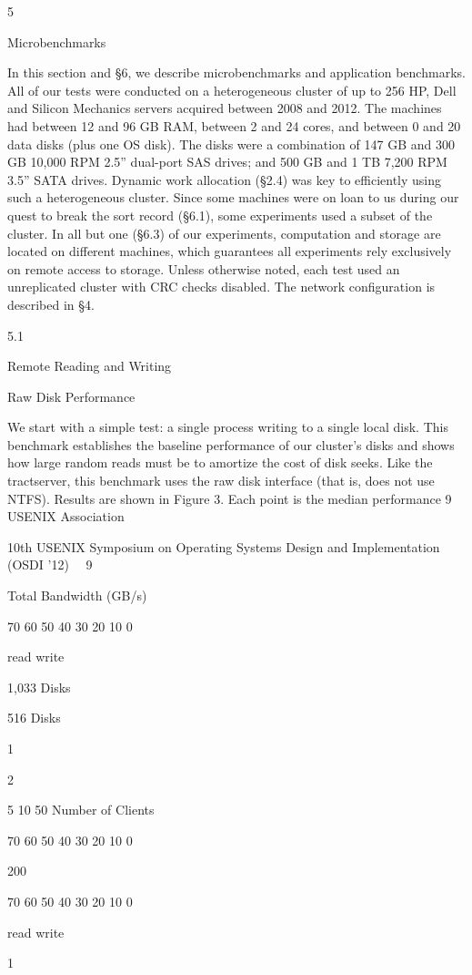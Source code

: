 5

Microbenchmarks

In this section and §6, we describe microbenchmarks
and application benchmarks. All of our tests were conducted on a heterogeneous cluster of up to 256 HP, Dell
and Silicon Mechanics servers acquired between 2008
and 2012. The machines had between 12 and 96 GB
RAM, between 2 and 24 cores, and between 0 and 20
data disks (plus one OS disk). The disks were a combination of 147 GB and 300 GB 10,000 RPM 2.5” dual-port
SAS drives; and 500 GB and 1 TB 7,200 RPM 3.5” SATA
drives. Dynamic work allocation (§2.4) was key to efficiently using such a heterogeneous cluster. Since some
machines were on loan to us during our quest to break the
sort record (§6.1), some experiments used a subset of the
cluster. In all but one (§6.3) of our experiments, computation and storage are located on different machines,
which guarantees all experiments rely exclusively on remote access to storage. Unless otherwise noted, each test
used an unreplicated cluster with CRC checks disabled.
The network configuration is described in §4.

5.1

Remote Reading and Writing

Raw Disk Performance

We start with a simple test: a single process writing to
a single local disk. This benchmark establishes the baseline performance of our cluster’s disks and shows how
large random reads must be to amortize the cost of disk
seeks. Like the tractserver, this benchmark uses the raw
disk interface (that is, does not use NTFS). Results are
shown in Figure 3. Each point is the median performance
9
USENIX Association  

10th USENIX Symposium on Operating Systems Design and Implementation (OSDI ’12)  9


Total Bandwidth (GB/s)

70
60
50
40
30
20
10
0

read
write

1,033 Disks

516 Disks

1

2

5 10
50
Number of Clients

70
60
50
40
30
20
10
0

200

70
60
50
40
30
20
10
0

read
write

1

